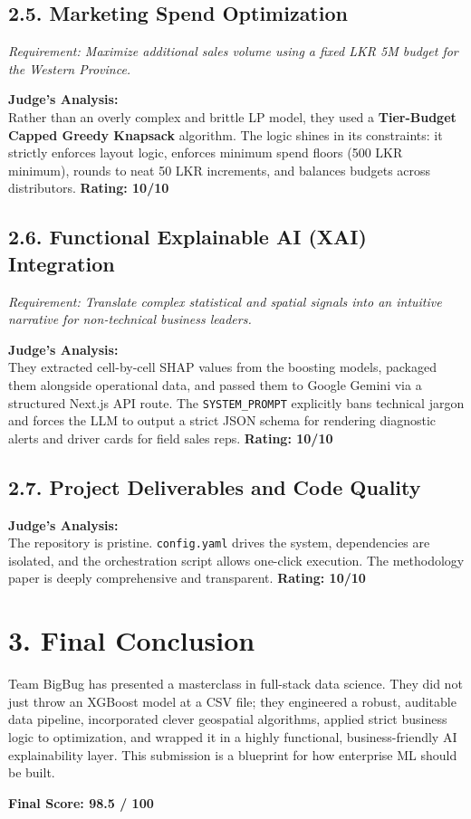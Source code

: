 \documentclass[11pt, a4paper]{article}
\begin{document}
\subsection*{2.5. Marketing Spend Optimization}
\textit{Requirement: Maximize additional sales volume using a fixed LKR 5M budget for the Western Province.}

\textbf{\textcolor{judgereview}{Judge's Analysis:}} \\
Rather than an overly complex and brittle LP model, they used a \textbf{Tier-Budget Capped Greedy Knapsack} algorithm. The logic shines in its constraints: it strictly enforces layout logic, enforces minimum spend floors (500 LKR minimum), rounds to neat 50 LKR increments, and balances budgets across distributors.
\textbf{Rating: 10/10}

\subsection*{2.6. Functional Explainable AI (XAI) Integration}
\textit{Requirement: Translate complex statistical and spatial signals into an intuitive narrative for non-technical business leaders.}

\textbf{\textcolor{judgereview}{Judge's Analysis:}} \\
They extracted cell-by-cell SHAP values from the boosting models, packaged them alongside operational data, and passed them to Google Gemini via a structured Next.js API route. The \texttt{SYSTEM\_PROMPT} explicitly bans technical jargon and forces the LLM to output a strict JSON schema for rendering diagnostic alerts and driver cards for field sales reps.
\textbf{Rating: 10/10}

\subsection*{2.7. Project Deliverables and Code Quality}

\textbf{\textcolor{judgereview}{Judge's Analysis:}} \\
The repository is pristine. \texttt{config.yaml} drives the system, dependencies are isolated, and the orchestration script allows one-click execution. The methodology paper is deeply comprehensive and transparent.
\textbf{Rating: 10/10}

\vspace{0.5cm}

\section*{3. Final Conclusion}
Team BigBug has presented a masterclass in full-stack data science. They did not just throw an XGBoost model at a CSV file; they engineered a robust, auditable data pipeline, incorporated clever geospatial algorithms, applied strict business logic to optimization, and wrapped it in a highly functional, business-friendly AI explainability layer. This submission is a blueprint for how enterprise ML should be built.

\begin{center}
    {\Large \textbf{Final Score: 98.5 / 100}}
\end{center}
\end{document}

